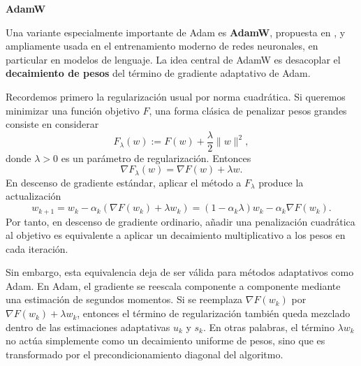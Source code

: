 \documentclass[11pt]{report}
\theoremstyle{definition}
\theoremstyle{plain}
\numberwithin{equation}{section}
\begin{document}
\textbf{AdamW}

Una variante especialmente importante de Adam es \textbf{AdamW}, propuesta en \cite{loshchilov-hutter-2019}, y ampliamente usada en el entrenamiento moderno de redes neuronales, en particular en modelos de lenguaje. La idea central de AdamW es desacoplar el \textbf{decaimiento de pesos} del término de gradiente adaptativo de Adam.

Recordemos primero la regularización usual por norma cuadrática. Si queremos minimizar una función objetivo \(F\), una forma clásica de penalizar pesos grandes consiste en considerar
\begin{equation*}
    F_\lambda(w)
    :=
    F(w)+\frac{\lambda}{2}\|w\|^2,
\end{equation*}
donde \(\lambda>0\) es un parámetro de regularización. Entonces
\begin{equation*}
    \nabla F_\lambda(w)
    =
    \nabla F(w)+\lambda w.
\end{equation*}
En descenso de gradiente estándar, aplicar el método a \(F_\lambda\) produce la actualización
\begin{equation*}
    w_{k+1}
    =
    w_k-\alpha_k(\nabla F(w_k)+\lambda w_k)
    =
    (1-\alpha_k\lambda)w_k-\alpha_k\nabla F(w_k).
\end{equation*}
Por tanto, en descenso de gradiente ordinario, añadir una penalización cuadrática al objetivo es equivalente a aplicar un decaimiento multiplicativo a los pesos en cada iteración.

Sin embargo, esta equivalencia deja de ser válida para métodos adaptativos como Adam. En Adam, el gradiente se reescala componente a componente mediante una estimación de segundos momentos. Si se reemplaza \(\nabla F(w_k)\) por \(\nabla F(w_k)+\lambda w_k\), entonces el término de regularización también queda mezclado dentro de las estimaciones adaptativas \(u_k\) y \(s_k\). En otras palabras, el término \(\lambda w_k\) no actúa simplemente como un decaimiento uniforme de pesos, sino que es transformado por el precondicionamiento diagonal del algoritmo.
\end{document}
